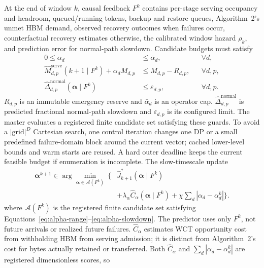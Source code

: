 At the end of window $k$, causal feedback $F^k$ contains per-stage serving
occupancy and headroom, queued/running tokens, backup and restore queues,
Algorithm~2's unmet HBM demand, observed recovery outcomes when failures occur,
counterfactual recovery estimates otherwise, the calibrated window hazard
$\rho_k$, and prediction error for normal-path slowdown.  Candidate budgets
must satisfy
\begin{align}
  0\le\alpha_d&\le\bar\alpha_d, &&\forall d,
    \label{eq:alpha-range}\\
  \widehat M_{d,p}^{\mathrm{serve}}(k+1\mid F^k)
    +\alpha_d M_{d,p}&\le M_{d,p}-R_{d,p}, &&\forall d,p,
    \label{eq:alpha-headroom}\\
  \widehat\Delta_{d,p}^{\mathrm{normal}}
    (\boldsymbol\alpha\mid F^k)&\le\varepsilon_{d,p}, &&\forall d,p.
    \label{eq:alpha-slowdown}
\end{align}
$R_{d,p}$ is an immutable emergency reserve and $\bar\alpha_d$ is an operator
cap.  $\widehat\Delta^{\mathrm{normal}}_{d,p}$ is predicted fractional
normal-path slowdown and $\varepsilon_{d,p}$ is its configured limit.  The
master evaluates a registered finite candidate set satisfying these guards.
To avoid a $|\mathrm{grid}|^D$ Cartesian search, one control iteration changes
one DP or a small predefined failure-domain block around the current vector;
cached lower-level bounds and warm starts are reused.  A hard outer deadline
keeps the current feasible budget if enumeration is incomplete.  The
slow-timescale
update
\begin{equation}
  \begin{aligned}
  \boldsymbol\alpha^{k+1}\in
  \arg\min_{\boldsymbol\alpha\in\mathcal A(F^k)}\ \{&
    \widehat J_{k+1}^*(\boldsymbol\alpha\mid F^k)\\
    &+\lambda_{\alpha}\widehat C_{\alpha}
      (\boldsymbol\alpha\mid F^k)
    +\chi\textstyle\sum_d\left|\alpha_d-\alpha_d^k\right|\}.
  \end{aligned}
  \label{eq:alpha-update}
\end{equation}
where $\mathcal A(F^k)$ is the registered finite candidate set satisfying
Equations~\ref{eq:alpha-range}--\ref{eq:alpha-slowdown}.
The predictor uses only $F^k$, not future arrivals or realized future failures.
$\widehat C_{\alpha}$ estimates WCT opportunity cost from withholding
HBM from serving admission; it is distinct from Algorithm~2's cost for bytes
actually retained or transferred.  Both $\widehat C_{\alpha}$ and
$\sum_d|\alpha_d-\alpha_d^k|$ are registered dimensionless scores, so
